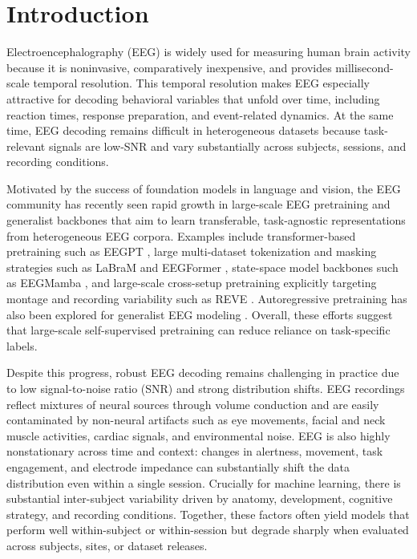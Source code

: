 \documentclass[12pt]{article}
\begin{document}
\section{Introduction}

Electroencephalography (EEG) is widely used for measuring human brain activity because it is noninvasive, comparatively inexpensive, and provides millisecond-scale temporal resolution. This temporal resolution makes EEG especially attractive for decoding behavioral variables that unfold over time, including reaction times, response preparation, and event-related dynamics. At the same time, EEG decoding remains difficult in heterogeneous datasets because task-relevant signals are low-SNR and vary substantially across subjects, sessions, and recording conditions.

Motivated by the success of foundation models in language and vision, the EEG community has recently seen rapid growth in large-scale EEG pretraining and generalist backbones that aim to learn transferable, task-agnostic representations from heterogeneous EEG corpora. Examples include transformer-based pretraining such as EEGPT \citep{wang2024eegpt}, large multi-dataset tokenization and masking strategies such as LaBraM \citep{Jiang2024LaBraM} and EEGFormer \citep{Chen2024EEGFormer}, state-space model backbones such as EEGMamba \citep{Wang2025EEGMamba}, and large-scale cross-setup pretraining explicitly targeting montage and recording variability such as REVE \citep{ElOuahidi2025REVE}. Autoregressive pretraining has also been explored for generalist EEG modeling \citep{Yue2024BrainGPT}. Overall, these efforts suggest that large-scale self-supervised pretraining can reduce reliance on task-specific labels.

Despite this progress, robust EEG decoding remains challenging in practice due to low signal-to-noise ratio (SNR) and strong distribution shifts. EEG recordings reflect mixtures of neural sources through volume conduction and are easily contaminated by non-neural artifacts such as eye movements, facial and neck muscle activities, cardiac signals, and environmental noise. EEG is also highly nonstationary across time and context: changes in alertness, movement, task engagement, and electrode impedance can substantially shift the data distribution even within a single session. Crucially for machine learning, there is substantial inter-subject variability driven by anatomy, development, cognitive strategy, and recording conditions. Together, these factors often yield models that perform well within-subject or within-session but degrade sharply when evaluated across subjects, sites, or dataset releases.
\end{document}
